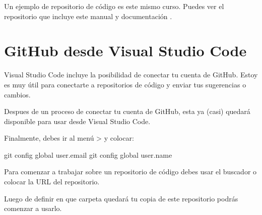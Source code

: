 \documentclass[a4paper,12pt,spanish]{sphinxmanual}
\begin{document}
\sphinxAtStartPar
Un ejemplo de repositorio de código es este mismo curso.
Puedes ver el repositorio que incluye este manual y documentación
.

\noindent{}


\section{GitHub desde Visual Studio Code}
\label{\detokenize{github:github-desde-visual-studio-code}}
\sphinxAtStartPar
Visual Studio Code incluye la posibilidad de conectar tu cuenta de GitHub.
Estoy es muy útil para conectarte a repositorios de código y enviar tus
sugerencias o cambios.

\noindent{}

\sphinxAtStartPar
Despues de un proceso de conectar tu cuenta de GitHub, esta ya
(casi) quedará disponible para usar desde Visual Studio Code.

\noindent{}

\sphinxAtStartPar
Finalmente, debes ir al menú  \sphinxhyphen{}\textgreater{}  y colocar:

\begin{sphinxVerbatim}[commandchars=\\\{\}]
git config \PYGZhy{}\PYGZhy{}global user.email 
git config \PYGZhy{}\PYGZhy{}global user.name 
\end{sphinxVerbatim}

\noindent{}

\sphinxAtStartPar
Para comenzar a trabajar sobre un repositorio de código debes usar el
buscador o colocar la URL del repositorio.

\noindent{}

\sphinxAtStartPar
Luego de definir en que carpeta quedará tu copia de este repositorio
podrás comenzar a usarlo.

\noindent{}
\end{document}

